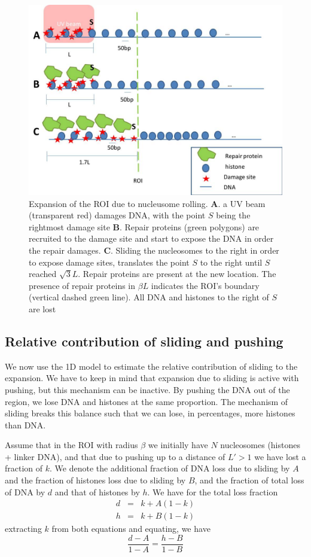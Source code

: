 \documentclass[12pt]{report}
\begin{document}
   \begin{figure}
   	\centering
   	\includegraphics[width=0.7\linewidth]{Images/SlidingModel/histoneSlidingMulti}
   	\caption{Expansion of the ROI due to nucleusome rolling. \textbf{A}. a UV beam (transparent red) damages DNA, with the point $S$ being the rightmost damage site \textbf{B}. Repair proteins (green polygons) are recruited to the damage site and start to expose the DNA in order the repair damages. \textbf{C}. Sliding the nucleosomes to the right in order to expose damage sites, translates the point $S$ to the right until $S$ reached $\sqrt{3}L$. Repair proteins are present at the new location. The presence of repair proteins in $\beta L$ indicates the ROI's boundary (vertical dashed green line). All DNA and histones to the right of $S$ are lost}
   	\label{fig:histoneSlidingMulti}
   \end{figure}
   
\subsection{Relative contribution of sliding and pushing}
  We now use the 1D model to estimate the relative contribution of sliding to the expansion. We have to keep in mind that expansion due to sliding is active with pushing, but this mechanism can be inactive.
  By pushing the DNA out of the region, we lose DNA and histones at the same proportion. The mechanism of sliding breaks this balance such that we can lose, in percentages, more histones than DNA. 
  
  Assume that in the ROI with radius $\beta$ we initially have $N$ nucleosomes (histones + linker DNA), and that due to pushing up to a distance of $L'>1$ we have lost a fraction of $k$. We denote the additional fraction of DNA loss due to sliding by $A$ and the fraction of histones loss due to sliding by $B$, and the fraction of total loss of DNA by $d$ and that of histones by $h$. We have for the total loss fraction  
  \begin{eqnarray*}
  d &=& k+A(1-k) \\
  h &=& k+B(1-k)
  \end{eqnarray*}
  extracting $k$ from both equations and equating, we have 
  \begin{equation*}
   \frac{d-A}{1-A}=\frac{h-B}{1-B}
  \end{equation*}
  
\end{document}
